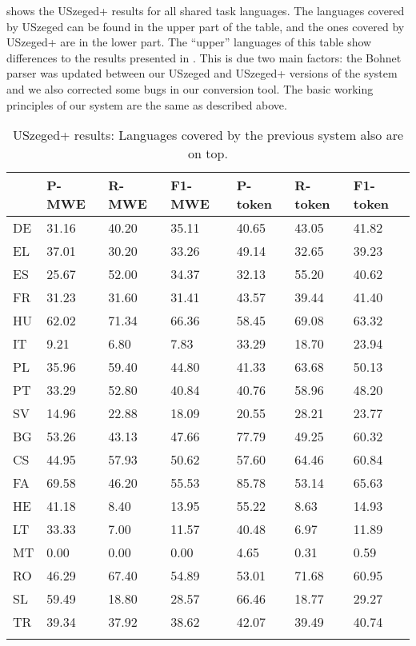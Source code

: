 \documentclass[output=paper,
modfonts,
]{langscibook}
\begin{document}
 shows the USzeged+ results for all shared task languages. The languages covered by USzeged can be found in the upper part of the table, and the ones covered by USzeged+ are in the lower part. The ``upper'' languages of this table show differences to the results presented in \citep{Simko2017}. This is due two main factors: the Bohnet parser was updated between our USzeged and USzeged+ versions of the system and we also corrected some bugs in our conversion tool. The basic working principles of our system are the same as described above.

\begin{table}
\centering
\caption{USzeged+ results: Languages covered by the previous system also are on top.}
\label{resultstable2}
\begin{tabular}{lllllll}
  \lsptoprule
& P-MWE & R-MWE  & F1-MWE  & P-token & R-token & F1-token \\
 \midrule
DE     & 31.16 & 40.20 & 35.11 & 40.65 & 43.05 & 41.82   \\
EL     & 37.01 & 30.20 & 33.26 & 49.14 & 32.65 & 39.23   \\
ES     & 25.67 & 52.00 & 34.37 & 32.13 & 55.20 & 40.62   \\
FR     & 31.23 & 31.60 & 31.41 & 43.57 & 39.44 & 41.40   \\
HU     & 62.02 & 71.34 & 66.36 & 58.45 & 69.08 & 63.32   \\
IT     & 9.21 & 6.80 & 7.83 & 33.29 & 18.70 & 23.94   \\
PL     & 35.96 & 59.40 & 44.80 & 41.33 & 63.68 & 50.13   \\
PT     & 33.29 & 52.80 & 40.84 & 40.76 & 58.96 & 48.20   \\
SV     & 14.96 & 22.88 & 18.09 & 20.55 & 28.21 & 23.77   \\
   \midrule 
BG     & 53.26 & 43.13 & 47.66 & 77.79 & 49.25 & 60.32   \\
CS     & 44.95 & 57.93 & 50.62 & 57.60 & 64.46 & 60.84   \\
FA     & 69.58 & 46.20 & 55.53 & 85.78 & 53.14 & 65.63   \\
HE     & 41.18 & 8.40 & 13.95 & 55.22 & 8.63 & 14.93  \\
LT     & 33.33 & 7.00 & 11.57 & 40.48 & 6.97 & 11.89  \\
MT     & 0.00 & 0.00 & 0.00 & 4.65 & 0.31 & 0.59  \\
RO     & 46.29 & 67.40 & 54.89 & 53.01 & 71.68 & 60.95  \\
SL     & 59.49 & 18.80 & 28.57 & 66.46 & 18.77 & 29.27  \\
TR     & 39.34 & 37.92 & 38.62 & 42.07 & 39.49 & 40.74  \\

  \lspbottomrule
\end{tabular}
\end{table}
\end{document}
